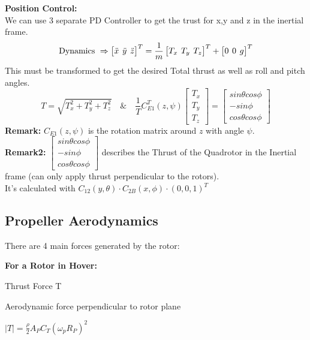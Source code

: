 \documentclass[fontsize=6pt,DIV=calc,a4paper,ngerman]{scrartcl}
\begin{document}
\begin{multicols*}{4}
	\smallskip
	\textbf{Position Control:}\\
	We can use 3 separate PD Controller to get the trust for x,y and z in the inertial frame.
	$$\text{Dynamics } \Rightarrow \setlength\arraycolsep{2pt}\begin{bmatrix}\ddot{x} &\ddot{y}&\ddot{z} \end{bmatrix}^T = \frac{1}{m}\begin{bmatrix}T_x&T_y&T_z \end{bmatrix}^T + \begin{bmatrix}0 &0 &g \end{bmatrix}^T$$
	This must be transformed to get the desired Total thrust as well as roll and pitch angles.
	$$T = \sqrt{T_x^2+T_y^2+T_z^2} \quad \& \quad \frac{1}{T} C_{E1}^T(z,\psi)
		\begin{bmatrix}
			T_x \\ T_y \\ T_z
		\end{bmatrix}
		=
		\begin{bmatrix}
			sin\theta cos\phi \\ -sin\phi \\ cos\theta cos\phi
		\end{bmatrix}$$
	\textbf{Remark:} $C_{E1}(z,\psi)$ is the rotation matrix around $z$ with angle $\psi$.\\
	\textbf{Remark2:} $\left[\begin{smallmatrix} sin\theta cos\phi  \\ -sin\phi \\ cos\theta cos\phi \end{smallmatrix}\right]$ describes the Thrust of the Quadrotor in the Inertial frame (can only apply thrust perpendicular to the rotors). \\
	It's calculated with $C_{12}(y,\theta)\cdot C_{2B}(x,\phi)\cdot (0,0,1)^T$
	\subsection{Propeller Aerodynamics}
	There are 4 main forces generated by the rotor:

	\medskip
	\textbf{For a Rotor in Hover:}

	\smallskip
	\begin{minipage}{0.45\linewidth}
		Thrust Force T

		\smallskip
		Aerodynamic force perpendicular to rotor plane

		\smallskip
		$|T|=\frac{\rho}{2}A_PC_T(\omega_pR_P)^2$


\end{minipage}
\end{multicols*}
\end{document}
